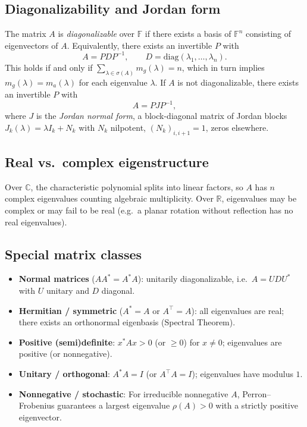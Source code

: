 \documentclass[12pt,a4paper]{article}
\theoremstyle{plain}
\theoremstyle{definition}
\theoremstyle{remark}
\theoremstyle{remark}
\begin{document}
	\subsection*{Diagonalizability and Jordan form}
	The matrix $A$ is \emph{diagonalizable} over $\mathbb{F}$ if there exists a basis of $\mathbb{F}^n$ consisting of eigenvectors of $A$. Equivalently, there exists an invertible $P$ with
	\[
	A=P D P^{-1},\qquad D=\mathrm{diag}(\lambda_1,\dots,\lambda_n).
	\]
	This holds if and only if $\sum_{\lambda\in\sigma(A)} m_g(\lambda)=n$, which in turn implies $m_g(\lambda)=m_a(\lambda)$ for each eigenvalue $\lambda$.
	If $A$ is not diagonalizable, there exists an invertible $P$ with
	\[
	A = P J P^{-1},
	\]
	where $J$ is the \emph{Jordan normal form}, a block-diagonal matrix of Jordan blocks
	$J_k(\lambda)=\lambda I_k+N_k$ with $N_k$ nilpotent, $(N_k)_{i,i+1}=1$, zeros elsewhere.
	
	\subsection*{Real vs.\ complex eigenstructure}
	Over $\mathbb{C}$, the characteristic polynomial splits into linear factors, so $A$ has $n$ complex eigenvalues counting algebraic multiplicity. Over $\mathbb{R}$, eigenvalues may be complex or may fail to be real (e.g.\ a planar rotation without reflection has no real eigenvalues).
	
	\subsection*{Special matrix classes}
	\begin{itemize}
		\item \textbf{Normal matrices} ($AA^*=A^*A$): unitarily diagonalizable, i.e.\ $A=U D U^*$ with $U$ unitary and $D$ diagonal.
		\item \textbf{Hermitian / symmetric} ($A^*=A$ or $A^\top=A$): all eigenvalues are real; there exists an orthonormal eigenbasis (Spectral Theorem).
		\item \textbf{Positive (semi)definite}: $x^* A x>0$ (or $\ge 0$) for $x\ne 0$; eigenvalues are positive (or nonnegative).
		\item \textbf{Unitary / orthogonal}: $A^*A=I$ (or $A^\top A=I$); eigenvalues have modulus $1$.
		\item \textbf{Nonnegative / stochastic}: For irreducible nonnegative $A$, Perron--Frobenius guarantees a largest eigenvalue $\rho(A)>0$ with a strictly positive eigenvector.
	\end{itemize}
	
\end{document}
